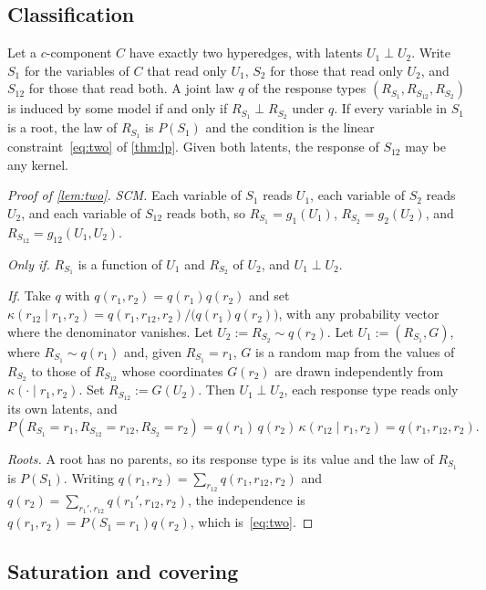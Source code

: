 \subsection{Classification}
\label{app:thm}

\begin{lemma}
\label{lem:two}
Let a $c$-component $C$ have exactly two hyperedges, with latents
$U_1\perp U_2$. Write $S_1$ for the variables of $C$ that read only $U_1$,
$S_2$ for those that read only $U_2$, and $S_{12}$ for those that read both.
A joint law $q$ of the response types $(R_{S_1},R_{S_{12}},R_{S_2})$ is
induced by some model if and only if $R_{S_1}\perp R_{S_2}$ under $q$. If
every variable in $S_1$ is a root, the law of $R_{S_1}$ is $P(S_1)$ and the
condition is the linear constraint~\eqref{eq:two} of \cref{thm:lp}.
Given both latents, the response of $S_{12}$ may be any kernel.
\end{lemma}


\begin{proof}[Proof of \cref{lem:two}]
\emph{SCM.} Each variable of $S_1$ reads $U_1$, each variable of $S_2$ reads
$U_2$, and each variable of $S_{12}$ reads both, so
$R_{S_1}=g_1(U_1)$, $R_{S_2}=g_2(U_2)$, and $R_{S_{12}}=g_{12}(U_1,U_2)$.

\emph{Only if.} $R_{S_1}$ is a function of $U_1$ and $R_{S_2}$ of $U_2$, and
$U_1\perp U_2$.

\emph{If.} Take $q$ with $q(r_1,r_2)=q(r_1)q(r_2)$ and set
$\kappa(r_{12}\mid r_1,r_2)=q(r_1,r_{12},r_2)/\bigl(q(r_1)q(r_2)\bigr)$,
with any probability vector where the denominator vanishes. Let
$U_2:=R_{S_2}\sim q(r_2)$. Let $U_1:=(R_{S_1},G)$, where $R_{S_1}\sim q(r_1)$
and, given $R_{S_1}=r_1$, $G$ is a random map from the values of $R_{S_2}$ to
those of $R_{S_{12}}$ whose coordinates $G(r_2)$ are drawn independently from
$\kappa(\cdot\mid r_1,r_2)$. Set $R_{S_{12}}:=G(U_2)$. Then $U_1\perp U_2$,
each response type reads only its own latents, and
\[
P(R_{S_1}{=}r_1,R_{S_{12}}{=}r_{12},R_{S_2}{=}r_2)
=q(r_1)\,q(r_2)\,\kappa(r_{12}\mid r_1,r_2)=q(r_1,r_{12},r_2).
\]

\emph{Roots.} A root has no parents, so its response type is its value and
the law of $R_{S_1}$ is $P(S_1)$. Writing
$q(r_1,r_2)=\sum_{r_{12}}q(r_1,r_{12},r_2)$ and
$q(r_2)=\sum_{r_1',r_{12}}q(r_1',r_{12},r_2)$, the independence is
$q(r_1,r_2)=P(S_1{=}r_1)q(r_2)$, which is~\eqref{eq:two}.
\end{proof}

\subsection{Saturation and covering}
\label{app:saturation}

